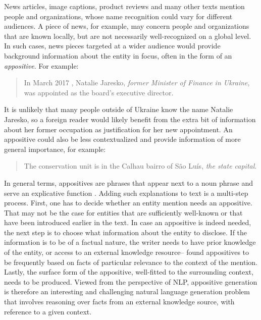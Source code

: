 \documentclass[11pt]{article}
\newcommand{\jttodo}[1]{\todo[color=blue!20]{#1}}
\begin{document}
News articles, image captions, product reviews and many other texts mention people and organizations, whose name recognition could vary for different audiences. A piece of news, for example, may concern people and organizations that are known locally, but are not necessarily well-recognized on a global level. In such cases, news pieces targeted at a wider audience would provide background information about the entity in focus, often in the form of an \textit{appositive}. For example:
\begin{quote}
In March 2017 , Natalie Jaresko, \textit{former Minister of Finance in Ukraine}, was appointed as the board's executive director.
\end{quote}
It is unlikely that many people outside of Ukraine know the name Natalie Jaresko, so a foreign reader would likely benefit from the extra bit of information about her former occupation as justification for her new appointment. An appositive could also be less contextualized and provide information of more general importance, for example:

\begin{quote}
The conservation unit is in the Calhau bairro of São Luís, \textit{the state capital}.
\end{quote}

In general terms, appositives are phrases that appear next to a noun phrase and serve an explicative function \cite{bauer2017nominal}.
Adding such explanations to text is a multi-step process. First, one has to decide whether an entity mention needs an appositive. That may not be the case for entities that are sufficiently well-known
or that have been introduced earlier in the text. In case an appositive is indeed needed, the next step is to choose what information about the entity to disclose. If the information is to be of a factual nature, the writer needs to have prior knowledge of the entity, or access to an external knowledge resource-- found appositives to be frequently based on facts of particular relevance to the context of the mention. Lastly, the surface form of the appositive, well-fitted to the surrounding context, needs to be produced. Viewed from the perspective of NLP, appositive generation is therefore an interesting and challenging natural language generation problem that involves reasoning over facts from an external knowledge source, with reference to a given context.
\end{document}
